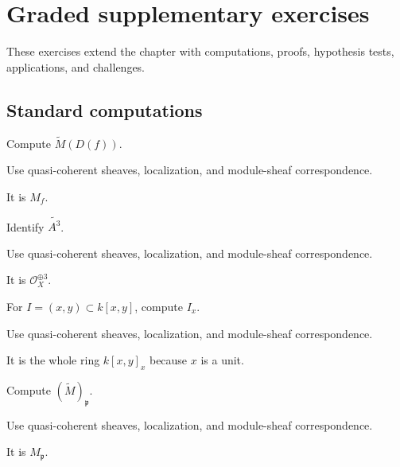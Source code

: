 \section{Graded supplementary exercises}
These exercises extend the chapter with computations, proofs, hypothesis tests, applications, and challenges.

\subsection*{Standard computations}

\begin{exercise}\label{exr:vi33-expand-01}
Compute $\widetilde M(D(f))$.
\end{exercise}
\begin{hint}
Use quasi-coherent sheaves, localization, and module-sheaf correspondence.
\end{hint}
\begin{solution}
It is $M_f$.
\end{solution}

\begin{exercise}\label{exr:vi33-expand-02}
Identify $\widetilde{A^3}$.
\end{exercise}
\begin{hint}
Use quasi-coherent sheaves, localization, and module-sheaf correspondence.
\end{hint}
\begin{solution}
It is $\mathcal O_X^{\oplus3}$.
\end{solution}

\begin{exercise}[Ideal on $D(x)$]\label{exr:vi33-expand-03}
For $I=(x,y)\subset k[x,y]$, compute $I_x$.
\end{exercise}
\begin{hint}
Use quasi-coherent sheaves, localization, and module-sheaf correspondence.
\end{hint}
\begin{solution}
It is the whole ring $k[x,y]_x$ because $x$ is a unit.
\end{solution}

\begin{exercise}[Stalk]\label{exr:vi33-expand-04}
Compute $(\widetilde M)_{\mathfrak p}$.
\end{exercise}
\begin{hint}
Use quasi-coherent sheaves, localization, and module-sheaf correspondence.
\end{hint}
\begin{solution}
It is $M_{\mathfrak p}$.
\end{solution}

